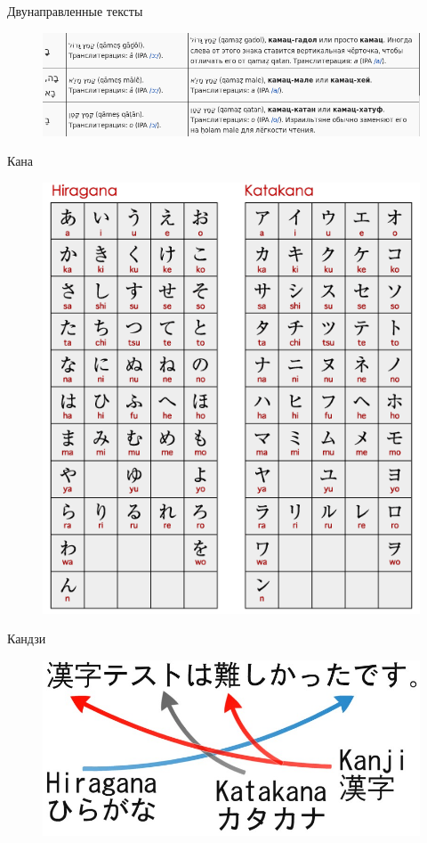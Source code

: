 \documentclass{beamer}
\begin{document}
\begin{frame}{Двунаправленные тексты}
\begin{figure}[H]
\includegraphics[scale=0.4]{bidirectional.png} 
\end{figure}
\end{frame}

\begin{frame}{Кана}
\begin{figure}[H]
\includegraphics[scale=0.35]{kana.png} 
\end{figure}
\end{frame}

\begin{frame}{Кандзи}
\begin{figure}[H]
\includegraphics[scale=0.3]{kanji.jpg} 
\end{figure}
\end{frame}
\end{document}
